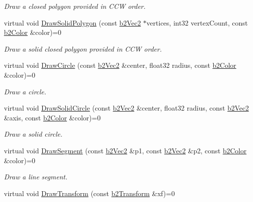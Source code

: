\begin{DoxyCompactItemize}
\begin{DoxyCompactList}\small\item\em Draw a closed polygon provided in C\-C\-W order. \end{DoxyCompactList}\item 
\hypertarget{classb2_draw_a76f2d67de0781a32cab116278c5c9eea}{virtual void \hyperlink{classb2_draw_a76f2d67de0781a32cab116278c5c9eea}{Draw\-Solid\-Polygon} (const \hyperlink{structb2_vec2}{b2\-Vec2} $\ast$vertices, int32 vertex\-Count, const \hyperlink{structb2_color}{b2\-Color} \&color)=0}\label{classb2_draw_a76f2d67de0781a32cab116278c5c9eea}

\begin{DoxyCompactList}\small\item\em Draw a solid closed polygon provided in C\-C\-W order. \end{DoxyCompactList}\item 
\hypertarget{classb2_draw_ae2effe9bca87c8d7cb90e860d13b7e9e}{virtual void \hyperlink{classb2_draw_ae2effe9bca87c8d7cb90e860d13b7e9e}{Draw\-Circle} (const \hyperlink{structb2_vec2}{b2\-Vec2} \&center, float32 radius, const \hyperlink{structb2_color}{b2\-Color} \&color)=0}\label{classb2_draw_ae2effe9bca87c8d7cb90e860d13b7e9e}

\begin{DoxyCompactList}\small\item\em Draw a circle. \end{DoxyCompactList}\item 
\hypertarget{classb2_draw_a775a1d0472c5980d597904c7b596a0a6}{virtual void \hyperlink{classb2_draw_a775a1d0472c5980d597904c7b596a0a6}{Draw\-Solid\-Circle} (const \hyperlink{structb2_vec2}{b2\-Vec2} \&center, float32 radius, const \hyperlink{structb2_vec2}{b2\-Vec2} \&axis, const \hyperlink{structb2_color}{b2\-Color} \&color)=0}\label{classb2_draw_a775a1d0472c5980d597904c7b596a0a6}

\begin{DoxyCompactList}\small\item\em Draw a solid circle. \end{DoxyCompactList}\item 
\hypertarget{classb2_draw_a1de5aaf50db875d1c644c596832af57d}{virtual void \hyperlink{classb2_draw_a1de5aaf50db875d1c644c596832af57d}{Draw\-Segment} (const \hyperlink{structb2_vec2}{b2\-Vec2} \&p1, const \hyperlink{structb2_vec2}{b2\-Vec2} \&p2, const \hyperlink{structb2_color}{b2\-Color} \&color)=0}\label{classb2_draw_a1de5aaf50db875d1c644c596832af57d}

\begin{DoxyCompactList}\small\item\em Draw a line segment. \end{DoxyCompactList}\item 
virtual void \hyperlink{classb2_draw_ade698123482a491a7a61fa1fe4d3a4f4}{Draw\-Transform} (const \hyperlink{structb2_transform}{b2\-Transform} \&xf)=0
\end{DoxyCompactItemize}
